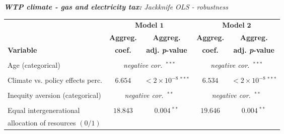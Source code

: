 \documentclass[a4paper,12pt]{article}
\begin{document}
{\centering
\begin{threeparttable}
\singlespacing
\caption{\textit{\textbf{\small{WTP climate - gas and electricity tax:}} Jackknife OLS - robustness}}

\label{GasInOut} 
\centering
\begin{small}
\vspace{-1cm}
\begin{tabular}{lcccc} 
\vspace{-0.8cm}
\\
\hline
  \multicolumn{1}{l}{}&\multicolumn{2}{c}{\textbf{Model} $\boldsymbol{1}$}%
  &\multicolumn{2}{c}{\textbf{Model} $\boldsymbol{2}$}\\%
\cmidrule(lr){2-3} \cmidrule(lr){4-5}
  \multicolumn{1}{l}{} & \multicolumn{1}{c}{\textbf{Aggreg.}}& \multicolumn{1}{c}{\textbf{Aggreg.}}& \multicolumn{1}{c}{\textbf{Aggreg.}} &  \multicolumn{1}{c}{\textbf{Aggreg.}} \\
 \multicolumn{1}{l}{\textbf{Variable}} & \multicolumn{1}{c}{\textbf{coef.}}& \multicolumn{1}{c}{\textbf{adj. \textit{p}-value}}& \multicolumn{1}{c}{\textbf{coef.}} &  \multicolumn{1}{c}{\textbf{adj. \textit{p}-value}} \\
\hline  \vspace{-0.345cm}
\\
\vspace{-0.345cm}Age (categorical)\tnote{a}&\multicolumn{2}{c}{\textit{negative cor.~}$^{***}$}&\multicolumn{2}{c}{\textit{negative cor.~}$^{***}$}\\
  \\
\vspace{-0.345cm}Climate vs. policy effects perc.&$6.654$&$<2\times10^{-8}~^{***}$&$6.534$&$<2\times10^{-8}~^{***}$\\
  \\
  \vspace{-0.345cm}Inequity aversion (categorical)\tnote{a}&\multicolumn{2}{c}{\textit{negative cor.~}$^{**}$}&\multicolumn{2}{c}{\textit{negative cor.~}$^{**}$}\\
      \\
 Equal intergenerational&\multirow{2}{*}{$18.843$}&\multirow{2}{*}{${0.004}~^{**}$}&\multirow{2}{*}{$19.646$}&\multirow{2}{*}{${0.004}~^{**}$}\\
\vspace{-0.345cm}\hspace{0.6cm}allocation of resources $(0/1)$&\\

\end{tabular}
\end{small}
\end{threeparttable}}
\end{document}
